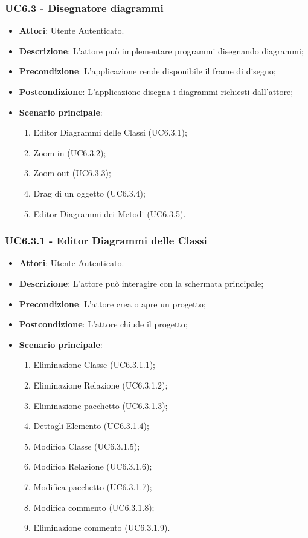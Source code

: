 \subsubsection{UC6.3 - Disegnatore diagrammi} 
\label{sssec:UC6.3} 
\begin{itemize} 
\item \textbf{Attori}: Utente Autenticato.
\item \textbf{Descrizione}: L'attore può implementare programmi disegnando diagrammi;
\item \textbf{Precondizione}: L'applicazione rende disponibile il frame di disegno;
\item \textbf{Postcondizione}: L'applicazione disegna i diagrammi richiesti dall'attore;
\item \textbf{Scenario principale}: \begin{enumerate}\item Editor Diagrammi delle Classi (UC6.3.1);\item Zoom-in (UC6.3.2);\item Zoom-out (UC6.3.3);\item Drag di un oggetto (UC6.3.4);\item Editor Diagrammi dei Metodi (UC6.3.5). 
 \end{enumerate}
\end{itemize} 
\subsubsection{UC6.3.1 - Editor Diagrammi delle Classi} 
\label{sssec:UC6.3.1} 
\begin{itemize} 
\item \textbf{Attori}: Utente Autenticato.
\item \textbf{Descrizione}: L'attore può interagire con la schermata principale;
\item \textbf{Precondizione}: L'attore crea o apre un progetto;
\item \textbf{Postcondizione}: L'attore chiude il progetto;
\item \textbf{Scenario principale}: \begin{enumerate}\item Eliminazione Classe (UC6.3.1.1);\item Eliminazione Relazione (UC6.3.1.2);\item Eliminazione pacchetto (UC6.3.1.3);\item Dettagli Elemento (UC6.3.1.4);\item Modifica Classe (UC6.3.1.5);\item Modifica Relazione (UC6.3.1.6);\item Modifica pacchetto (UC6.3.1.7);\item Modifica commento (UC6.3.1.8);\item Eliminazione commento (UC6.3.1.9). 
 \end{enumerate}
\end{itemize} 
